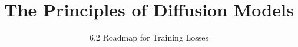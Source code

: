 
\title{The Principles of Diffusion Models}
\subtitle{6.2 Roadmap for Training Losses}


\begin{frame}
    \titlepage
\end{frame}


